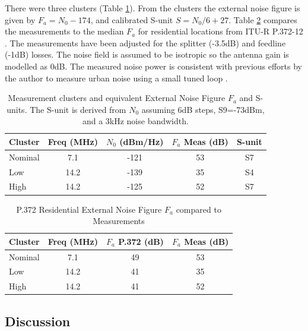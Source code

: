 \documentclass{article}
\begin{document}
There were three clusters (Table \ref{table:measurement_clusters}). From the clusters the external noise figure is given by $F_a = N_0 - 174$, and calibrated S-unit $S=N_0/6+27$. Table \ref{table:external_noise_figure} compares the measurements to the median $F_a$ for residential locations from ITU-R P.372-12 \cite[Fig. 10]{itu372}. The measurements have been adjusted for the splitter (-3.5dB) and feedline (-1dB) losses.  The noise field is assumed to be isotropic so the antenna gain is modelled as 0dB. The measured noise power is consistent with previous efforts by the author to measure urban noise using a small tuned loop \cite{rowetel_noise_city}.

\begin{table}[h]
\centering
\begin{tabular}{l c c c c}
 \hline
 Cluster & Freq (MHz) & $N_0$ (dBm/Hz) & $F_a$ Meas (dB) & S-unit \\
 \hline
 Nominal & 7.1  & -121 & 53 & S7 \\
 Low     & 14.2 & -139 & 35 & S4 \\
 High    & 14.2 & -125 & 52 & S7 \\
\end{tabular}
\caption{Measurement clusters and equivalent External Noise Figure $F_a$ and S-units.  The S-unit is derived from $N_0$ assuming 6dB steps, S9=-73dBm, and a 3kHz noise bandwidth.}
\label{table:measurement_clusters}
\end{table}

\begin{table}[h]
\centering
\begin{tabular}{l c c c}
 \hline
 Cluster & Freq (MHz) & $F_a$ P.372 (dB) & $F_a$ Meas (dB) \\
 \hline
 Nominal & 7.1  & 49 & 53 \\
 Low     & 14.2 & 41 & 35 \\
 High    & 14.2 & 41 & 52 \\
\end{tabular}
\caption{P.372 Residential External Noise Figure $F_a$ compared to Measurements}
\label{table:external_noise_figure}
\end{table}

\subsection{Discussion}
\end{document}
